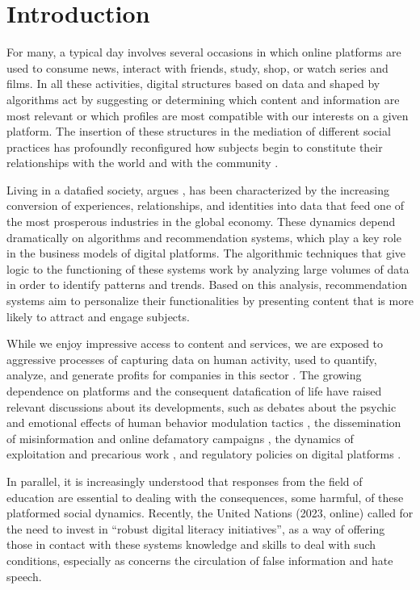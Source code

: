 \section{Introduction}\label{sec-introdução}

For many, a typical day involves several occasions in which online platforms are used to consume news, interact with friends, study, shop, or watch series and films. In all these activities, digital structures based on data and shaped by algorithms act by suggesting or determining which content and information are most relevant or which profiles are most compatible with our interests on a given platform. The insertion of these structures in the mediation of different social practices has profoundly reconfigured how subjects begin to constitute their relationships with the world and with the community \cite{Zuboff2020,Mbembe2021}.

Living in a datafied society, argues \textcite{Siles2024}, has been characterized by the increasing conversion of experiences, relationships, and identities into data that feed one of the most prosperous industries in the global economy. These dynamics depend dramatically on algorithms and recommendation systems, which play a key role in the business models of digital platforms. The algorithmic techniques that give logic to the functioning of these systems work by analyzing large volumes of data in order to identify patterns and trends. Based on this analysis, recommendation systems aim to personalize their functionalities by presenting content that is more likely to attract and engage subjects.

While we enjoy impressive access to content and services, we are exposed to aggressive processes of capturing data on human activity, used to quantify, analyze, and generate profits for companies in this sector \cite{Couldry2019,Siles2024}. The growing dependence on platforms and the consequent datafication of life \cite{VanEs2017} have raised relevant discussions about its developments, such as debates about the psychic and emotional effects of human behavior modulation tactics \cite{Bruno2019}, the dissemination of misinformation and online defamatory campaigns \cite{Rogers2023}, the dynamics of exploitation and precarious work \cite{Grohmann2023}, and regulatory policies on digital platforms \cite{Fletcher2023}.

In parallel, it is increasingly understood that responses from the field of education are essential to dealing with the consequences, some harmful, of these platformed social dynamics. Recently, the United Nations (2023, online) called for the need to invest in “robust digital literacy initiatives”, as a way of offering those in contact with these systems knowledge and skills to deal with such conditions, especially as concerns the circulation of false information and hate speech.

